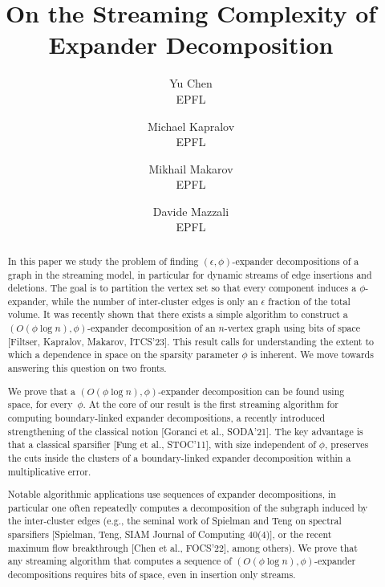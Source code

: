 \documentclass[epsfig,letter,11pt]{article}
\title{On the Streaming Complexity of Expander Decomposition}
\author{
	Yu Chen\\
	EPFL\\
	\and
	Michael Kapralov\\
	EPFL\\
	\and
	Mikhail Makarov\\
	EPFL\\
	\and
	Davide Mazzali\\
	EPFL\\}
\date{}
\numberwithin{equation}{section}
\begin{document}
\maketitle
\thispagestyle{empty}
\begin{abstract}
\noindent
In this paper we study the problem of finding $(\epsilon, \phi)$-expander decompositions of a graph in the streaming model, in particular for dynamic streams of edge insertions and deletions. The goal is to partition the vertex set so that every component induces a $\phi$-expander, while the number of inter-cluster edges is only an $\epsilon$ fraction of the total volume. It was recently shown that there exists a simple algorithm to construct a $(O(\phi \log n), \phi)$-expander decomposition of an $n$-vertex graph using  bits of space [Filtser, Kapralov, Makarov, ITCS'23]. This result calls for understanding the extent to which a dependence in space on the sparsity parameter $\phi$ is inherent. We move towards answering this question on two fronts.

We prove that a $(O(\phi \log n), \phi)$-expander decomposition can be found using~ space, for every~$\phi$.  At the core of our result is the first streaming algorithm for computing boundary-linked expander decompositions, a recently introduced strengthening of the classical notion [Goranci et al., SODA'21]. The key advantage is that a classical sparsifier [Fung et al., STOC'11], with size independent of $\phi$, preserves the cuts inside the clusters of a boundary-linked expander decomposition within a multiplicative error.

Notable algorithmic applications use sequences of expander decompositions, in particular one often repeatedly computes a decomposition of the subgraph induced by the inter-cluster edges (e.g., the seminal work of Spielman and Teng on spectral sparsifiers [Spielman, Teng, SIAM Journal of Computing 40(4)], or the recent maximum flow breakthrough [Chen et al., FOCS'22], among others). We prove that any streaming algorithm that computes a sequence of $(O(\phi \log n), \phi)$-expander decompositions requires  bits of space, even in insertion only streams.
\end{abstract}

\pagestyle{empty}
\newpage
\tableofcontents
\setcounter{page}{0}
\newpage

\pagestyle{plain}
\end{document}
